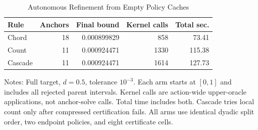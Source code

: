 \begin{table}[!htbp]
\centering\small
\caption{Autonomous Refinement from Empty Policy Caches}
\label{tab:r7_adaptive}
\begin{tabular}{lrrrr}
\toprule
Rule & Anchors & Final bound & Kernel calls & Total sec. \\
\midrule
Chord & 18 & 0.000899829 & 858 & 73.41 \\
Count & 11 & 0.000924471 & 1330 & 115.38 \\
Cascade & 11 & 0.000924471 & 1614 & 127.73 \\
\bottomrule
\end{tabular}
\par\smallskip
\begin{minipage}{0.98\linewidth}\footnotesize
Notes: Full target, $d=0.5$, tolerance $10^{-3}$. Each arm starts at $[0,1]$ and includes all rejected parent intervals. Kernel calls are action-wide upper-oracle applications, not anchor-solve calls. Total time includes both. Cascade tries local count only after compressed certification fails. All arms use identical dyadic split order, two endpoint policies, and eight certificate cells.
\end{minipage}
\end{table}
